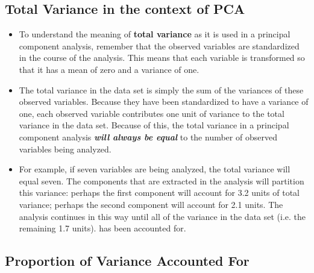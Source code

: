 \documentclass[a4paper,12pt]{article}
\begin{document}
\subsection{Total Variance in the context of PCA}
\begin{itemize}
	\item To understand the meaning of \textbf{total
		variance} as it is used in a principal component analysis, remember that the observed
	variables are standardized in the course of the analysis.  This means that each variable is
	transformed so that it has a mean of zero and a variance of one.
	
\item 	The total variance in the
	data set is simply the sum of the variances of these observed variables.  Because they have
	been standardized to have a variance of one, each observed variable contributes one unit of
	variance to the total variance in the data set.  Because of this, the total variance in a
	principal component analysis \textbf{\emph{will always be equal}} to the number of observed variables
	being analyzed.
	
\item 	For example, if seven variables are being analyzed, the total variance will
	equal seven.  The components that are extracted in the analysis will partition this variance:
	perhaps the first component will account for 3.2 units of total variance; perhaps the second
	component will account for 2.1 units.  The analysis continues in this way until all of the
	variance in the data set (i.e. the remaining 1.7 units). has been accounted for.
\end{itemize}


\subsection{Proportion of Variance Accounted For}
\end{document}

